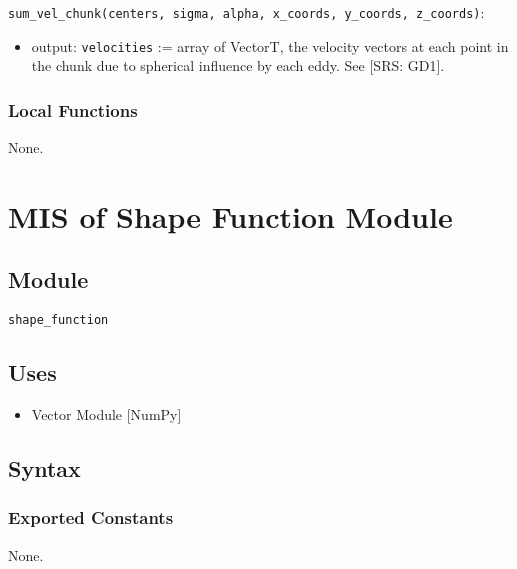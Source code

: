 \documentclass[12pt, titlepage]{article}
\begin{document}
\noindent \texttt{sum\_vel\_chunk(centers, sigma, alpha, x\_coords, y\_coords, z\_coords)}:\\

\begin{itemize}
\item output: \texttt{velocities} := array of VectorT, the velocity vectors at each point in the chunk due to spherical influence by each eddy. See [SRS: GD1].
\end{itemize}

\subsubsection{Local Functions}

None.


\newpage
\section{MIS of Shape Function Module} \label{mShape}

\subsection{Module}
\texttt{shape\_function}

\subsection{Uses}
\begin{itemize}
\item Vector Module [NumPy]
\end{itemize}

\subsection{Syntax}

\subsubsection{Exported Constants}
None.
\end{document}
